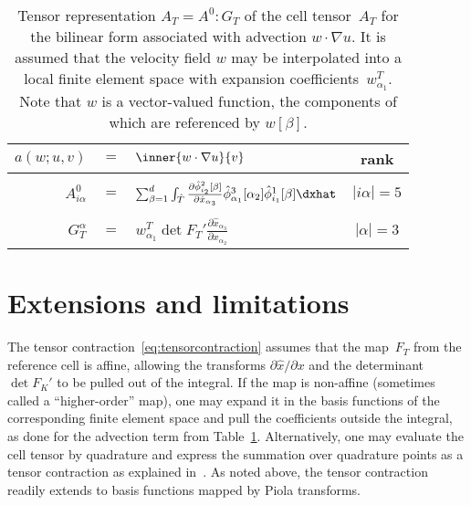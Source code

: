 \begin{table}
  \centering
  \begin{tabular}{rclc}
    \toprule
    $a(w; u, v)$ &$=$& $\inner{w \cdot \nabla u}{v}$ & rank \\
    \midrule
    &&&\\[-2ex]
    $A^0_{i\alpha}$ &$=$&
    $\sum_{\beta=1}^d
    \int_{\hat{T}}
    \frac{\partial \hat{\phi}^2_{i_2}[\beta]}{\partial \hat{x}_{\alpha_3}}
    \hat{\phi}^3_{\alpha_1}[\alpha_2]
    \hat{\phi}^1_{i_1}[\beta]
    \dxhat$
    & $|i\alpha| = 5$ \\[1ex]
    &&&\\[-2ex]
    $G_T^{\alpha}$ &$=$&
    $w^T_{\alpha_1} \det F_T'
    \frac{\partial \hat{x}_{\alpha_3}}{\partial x_{\alpha_2}}$
    & $|\alpha| = 3$ \\[1ex]
    \bottomrule
  \end{tabular}
  \caption{Tensor representation $A_T = A^0 : G_T$ of the cell
      tensor~$A_T$ for the bilinear form associated with advection $w
      \cdot \nabla u$. It is assumed that the velocity field $w$ may
      be interpolated into a local finite element space with expansion
      coefficients~$w^T_{\alpha_1}$. Note that $w$ is a vector-valued
      function, the components of which are referenced by $w[\beta]$.}
  \label{tab:advection}
\end{table}

\section{Extensions and limitations}

The tensor contraction~\eqref{eq:tensorcontraction} assumes that the
map~$F_T$ from the reference cell is affine, allowing the transforms
$\partial \hat{x} / \partial x$ and the determinant $\det F_K'$ to be pulled
out of the integral. If the map is non-affine (sometimes called a
``higher-order'' map), one may expand it in the basis functions of the
corresponding finite element space and pull the coefficients outside
the integral, as done for the advection term from
Table~\ref{tab:advection}. Alternatively, one may evaluate the cell
tensor by quadrature and express the summation over quadrature points
as a tensor contraction as explained in~\citet{KirbyLogg2006}.  As
noted above, the tensor contraction readily extends to basis functions
mapped by Piola transforms.

